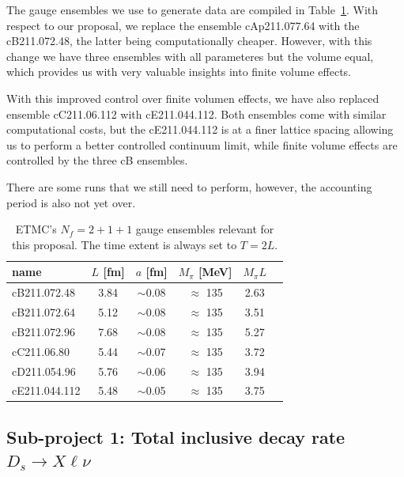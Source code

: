 \documentclass [a4paper, 11pt]{article}
\begin{document}
The gauge ensembles we use to generate data are compiled in Table~\ref{tab:ensembles}.
With respect to our proposal, we replace the ensemble cAp211.077.64
with the cB211.072.48, the latter being computationally
cheaper. However, with this change we have three ensembles with all
parameteres but the volume equal, which provides us with very valuable
insights into finite volume effects.

With this improved control over finite volumen effects, we have also
replaced ensemble cC211.06.112 with cE211.044.112. Both 
ensembles come with similar computational costs, but the cE211.044.112
is at a finer lattice spacing allowing us to perform a better
controlled continuum limit, while finite volume effects are controlled
by the three cB ensembles.

There are some runs that we still need to perform, however, the
accounting period is also not yet over.


\begin{table}[h]
	\centering %
	\begin{tabular}{lccccr} %
		\hline
		name          & $L$ [fm]      & $a$
		[fm]          & $M_\pi$ [MeV] & $M_\pi L$                         \\
		\hline
		\hline
		cB211.072.48  & 3.84          & $\sim$0.08 & $\approx$ 135 & 2.63 \\
		cB211.072.64  & 5.12          & $\sim$0.08 & $\approx$ 135 & 3.51 \\
		cB211.072.96  & 7.68          & $\sim$0.08 & $\approx$ 135 & 5.27 \\
		\hline
		cC211.06.80   & 5.44          & $\sim$0.07 & $\approx$ 135 & 3.72 \\
		\hline
		cD211.054.96  & 5.76          & $\sim$0.06 & $\approx$ 135 & 3.94 \\
		\hline
		cE211.044.112 & 5.48          & $\sim$0.05 & $\approx$ 135 & 3.75 \\
		\hline
	\end{tabular}
	\caption{ETMC's $N_f=2+1+1$ gauge ensembles relevant for this
		proposal. The time extent is always set to $T=2L$.}
	\label{tab:ensembles}
\end{table}

\subsection{Sub-project 1: Total inclusive decay rate $D_s \to X\ell\nu$}
\end{document}

